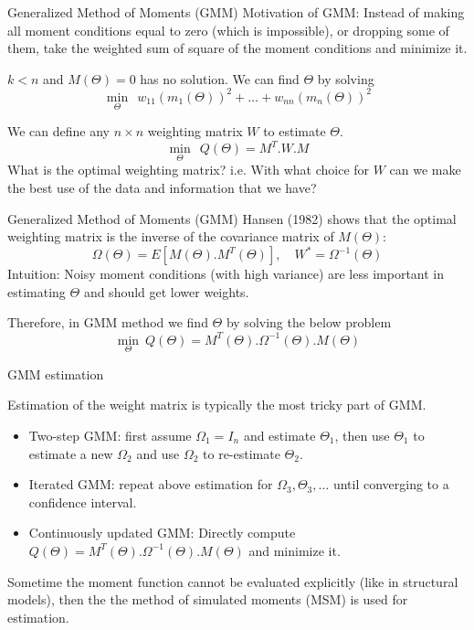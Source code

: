 \documentclass[handout]{beamer}
\begin{document}
\begin{frame}{Generalized Method of Moments (GMM)}
Motivation of GMM: 
Instead of making all moment conditions equal to zero (which is impossible), or dropping some of them, take the weighted sum of square of the moment conditions and minimize it.\medskip

$k<n$ and $M(\Theta)=0$ has no solution. We can find $\Theta$ by solving
\[\min_\Theta \ \  w_{11}(m_1(\Theta))^2+\dots+w_{nn}(m_n(\Theta))^2 \]



We can define any $n\times n$ weighting matrix $W$ to estimate $\Theta$.
\[\min_\Theta \ \  Q(\Theta)= M^T.W.M \]
What is the optimal weighting matrix? i.e. With what choice for $W$ can we make the best use of the data and information that we have?\medskip
\end{frame}

\begin{frame}{Generalized Method of Moments (GMM)}
Hansen (1982) shows that the optimal weighting matrix is the inverse of the covariance matrix of $M(\Theta)$:
\[ \Omega(\Theta)=E[M(\Theta).M^T(\Theta)],\quad W^*=\Omega^{-1}(\Theta) \]
Intuition: Noisy moment conditions (with high variance) are less important in estimating $\Theta$ and should get lower weights.\bigskip

Therefore, in GMM method we find $\Theta$ by solving the below problem
\[ \min_\Theta \  Q(\Theta)=M^T(\Theta).\Omega^{-1}(\Theta).M(\Theta)  \]
\end{frame}



\begin{frame}{GMM estimation}

Estimation of the weight matrix is typically the most tricky part of GMM.
\begin{itemize}
\item Two-step GMM: first assume $\Omega_1=I_n$ and estimate $\Theta_1$, then use $\Theta_1$ to estimate a new $\Omega_2$ and use $\Omega_2$ to re-estimate $\Theta_2$.
\item Iterated GMM: repeat above estimation for $\Omega_3,\Theta_3,\dots$ until converging to a confidence interval.
\item Continuously updated GMM: Directly compute $Q(\Theta)=M^T(\Theta).\Omega^{-1}(\Theta).M(\Theta)$ and minimize it.  

\end{itemize}\bigskip

Sometime the moment function cannot be evaluated explicitly (like in structural models), then the the method of simulated moments (MSM) is used for estimation.

\end{frame}
\end{document}
